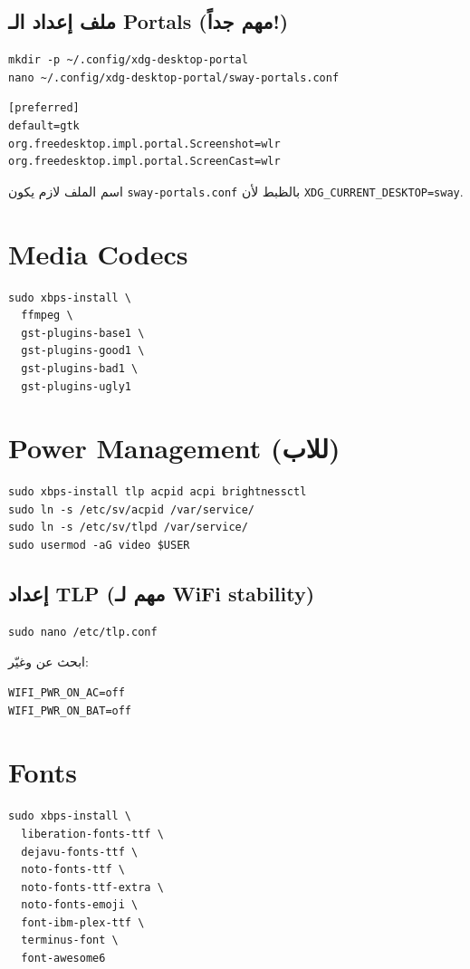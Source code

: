 \documentclass[12pt, a4paper]{report}
\begin{document}
\subsection{ملف إعداد الـ Portals (مهم جداً!)}
\begin{lstlisting}
mkdir -p ~/.config/xdg-desktop-portal
nano ~/.config/xdg-desktop-portal/sway-portals.conf
\end{lstlisting}

\begin{lstlisting}[style=inistyle]
[preferred]
default=gtk
org.freedesktop.impl.portal.Screenshot=wlr
org.freedesktop.impl.portal.ScreenCast=wlr
\end{lstlisting}

\begin{tcolorbox}[notebox]
اسم الملف لازم يكون \texttt{sway-portals.conf} بالظبط لأن \texttt{XDG\_CURRENT\_DESKTOP=sway}.
\end{tcolorbox}

\section{Media Codecs}
\begin{lstlisting}
sudo xbps-install \
  ffmpeg \
  gst-plugins-base1 \
  gst-plugins-good1 \
  gst-plugins-bad1 \
  gst-plugins-ugly1
\end{lstlisting}

\section{Power Management (للاب)}
\begin{lstlisting}
sudo xbps-install tlp acpid acpi brightnessctl
sudo ln -s /etc/sv/acpid /var/service/
sudo ln -s /etc/sv/tlpd /var/service/
sudo usermod -aG video $USER
\end{lstlisting}

\subsection{إعداد TLP (مهم لـ WiFi stability)}
\begin{lstlisting}
sudo nano /etc/tlp.conf
\end{lstlisting}
ابحث عن وغيّر:
\begin{lstlisting}[style=inistyle]
WIFI_PWR_ON_AC=off
WIFI_PWR_ON_BAT=off
\end{lstlisting}

\section{Fonts}
\begin{lstlisting}
sudo xbps-install \
  liberation-fonts-ttf \
  dejavu-fonts-ttf \
  noto-fonts-ttf \
  noto-fonts-ttf-extra \
  noto-fonts-emoji \
  font-ibm-plex-ttf \
  terminus-font \
  font-awesome6
\end{lstlisting}
\end{document}
